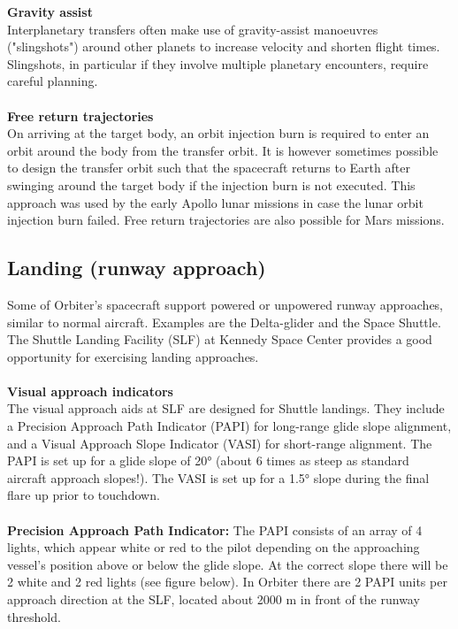 \documentclass[Orbiter User Manual.tex]{subfiles}
\begin{document}
\noindent
\textbf{Gravity assist}\\
Interplanetary transfers often make use of gravity-assist manoeuvres ("slingshots") around other planets to increase velocity and shorten flight times. Slingshots, in particular if they involve multiple planetary encounters, require careful planning.\\
\\
\textbf{Free return trajectories}\\
On arriving at the target body, an orbit injection burn is required to enter an orbit around the body from the transfer orbit. It is however sometimes possible to design the transfer orbit such that the spacecraft returns to Earth after swinging around the target body if the injection burn is not executed. This approach was used by the early Apollo lunar missions in case the lunar orbit injection burn failed. Free return trajectories are also possible for Mars missions.


\subsection{Landing (runway approach)}
\label{ssec:basic_landing}
Some of Orbiter's spacecraft support powered or unpowered runway approaches, similar to normal aircraft. Examples are the Delta-glider and the Space Shuttle. The Shuttle Landing Facility (SLF) at Kennedy Space Center provides a good opportunity for exercising landing approaches.\\
\\
\textbf{Visual approach indicators}\\
The visual approach aids at SLF are designed for Shuttle landings. They include a Precision Approach Path Indicator (PAPI) for long-range glide slope alignment, and a Visual Approach Slope Indicator (VASI) for short-range alignment. The PAPI is set up for a glide slope of 20° (about 6 times as steep as standard aircraft approach slopes!). The VASI is set up for a 1.5° slope during the final flare up prior to touchdown.\\
\\
\textbf{Precision Approach Path Indicator:} The PAPI consists of an array of 4 lights, which appear white or red to the pilot depending on the approaching vessel's position above or below the glide slope. At the correct slope there will be 2 white and 2 red lights (see figure below). In Orbiter there are 2 PAPI units per approach direction at the SLF, located about 2000 m in front of the runway threshold.
\end{document}
